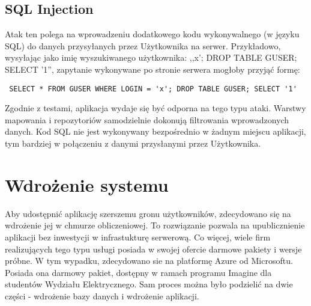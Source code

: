 \documentclass[a4paper,12pt,twoside,openany]{report}
\begin{document}
\section{SQL Injection}
Atak ten polega na wprowadzeniu dodatkowego kodu wykonywalnego (w języku SQL) do danych przysyłanych przez Użytkownika na serwer. Przykładowo, wysyłając jako imię wyszukiwanego użytkownika:  ,,x'; DROP TABLE GUSER; SELECT '1'', zapytanie wykonywane po stronie serwera mogłoby przyjąć formę:
\begin{lstlisting}
 SELECT * FROM GUSER WHERE LOGIN = 'x'; DROP TABLE GUSER; SELECT '1'
\end{lstlisting}
Zgodnie z testami, aplikacja wydaje się być odporna na tego typu ataki. Warstwy mapowania i repozytoriów samodzielnie dokonują filtrowania wprowadzonych danych. Kod SQL nie jest wykonywany bezpośrednio w żadnym miejscu aplikacji, tym bardziej w połączeniu z danymi przysłanymi przez Użytkownika.

\chapter{Wdrożenie systemu}
Aby udostępnić aplikację szerszemu gronu użytkowników, zdecydowano się na wdrożenie jej w chmurze obliczeniowej. To rozwiązanie pozwala na upublicznienie aplikacji bez inwestycji w infrastukturę serwerową. Co więcej, wiele firm realizujących tego typu usługi posiada w swojej ofercie darmowe pakiety i wersje próbne. W tym wypadku, zdecydowano sie na platformę Azure od Microsoftu. Posiada ona darmowy pakiet, dostępny w ramach programu Imagine dla studentów Wydziału Elektrycznego. Sam proces można było podzielić na dwie części - wdrożenie bazy danych i wdrożenie aplikacji.
\end{document}
